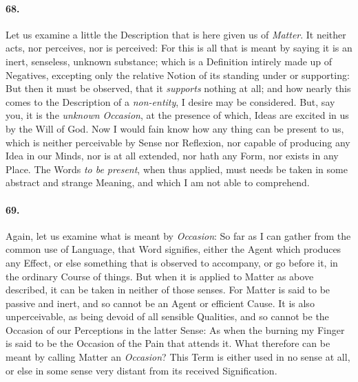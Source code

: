 \documentclass[]{article}
\newenvironment{sectionbody}{}{}
\begin{document}
\begin{sectionbody}
\paragraph{68.} Let us examine a little the Description that is here given us of
\emph{Matter}.  It neither acts, nor perceives, nor is
perceived: For this is all that is meant by saying it is an
inert, senseless, unknown substance; which is a Definition
intirely made up of Negatives, excepting only the relative Notion
of its standing under or supporting: But then it must be
observed, that it \emph{supports} nothing at all; and how nearly
this comes to the Description of a \emph{non-entity}, I desire may
be considered.  But, say you, it is the \emph{unknown
Occasion}, at the presence of which, Ideas are excited in us
by the Will of God.  Now I would fain know how any thing can be
present to us, which is neither perceivable by Sense nor
Reflexion, nor capable of producing any Idea in our Minds, nor is
at all extended, nor hath any Form, nor exists in any Place.  The
Words \emph{to be present}, when thus applied, must needs be
taken in some abstract and strange Meaning, and which I am not
able to comprehend.



\paragraph{69.} Again, let us examine what is meant by \emph{Occasion}: So far
as I can gather from the common use of Language, that Word
signifies, either the Agent which produces any Effect, or else
something that is observed to accompany, or go before it, in the
ordinary Course of things.  But when it is applied to Matter as
above described, it can be taken in neither of those senses.  For
Matter is said to be passive and inert, and so cannot be an Agent
or efficient Cause.  It is also unperceivable, as being devoid of
all sensible Qualities, and so cannot be the Occasion of our
Perceptions in the latter Sense: As when the burning my Finger is
said to be the Occasion of the Pain that attends it.  What
therefore can be meant by calling Matter an \emph{Occasion}?
This Term is either used in no sense at all, or else in some
sense very distant from its received Signification.




\end{sectionbody}
\end{document}
